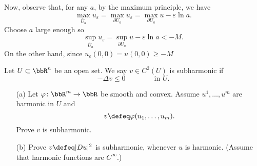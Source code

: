 \begin{solution}
  Now, observe that, for any \(a\), by the maximum principle, we have
  \[
    \max_{\bar U_a}u_\varepsilon=\max_{\partial
      U_a}u_\varepsilon=\max_{\partial U_a} u-\varepsilon \ln a.
  \]
  Choose \(a\) large enough so
  \[
    \sup_{\bar U_a} u_\varepsilon%
    =\sup_{\partial U_a} u-\varepsilon\ln a%
    <-M.
  \]
  On the other hand, since \(u_\varepsilon(0,0)=u(0,0)\geq -M\)
\end{solution}
\newpage

\begin{problem}
  Let \(U\subset\bbR^n\) be an open set. We say \(v \in C^2(U)\) is
  subharmonic if
  \[
    -\Delta v\leq 0\qquad\qquad\text{in \(U\).}
  \]
  \begin{itemize}
  \item[(a)] Let \(\varphi\colon\bbR^m\to\bbR\) be smooth and
    convex. Assume \(u^1,\dotsc,u^m\) are harmonic in \(U\) and
    \[
      v\defeq\varphi(u_1,\dotsc,u_m).
    \]
    Prove \(v\) is subharmonic.

    \noindent
    [\emph{Hint:} Convexity for a smooth function \(\varphi(z)\) is
    equivalent to \(\sum_{j,k=1}^m\varphi_{z_j,z_k}(z)\xi_j\xi_k\geq 0\)
    for any \(\xi\in\bbR^m\).]
  \item[(b)] Prove \(v\defeq|Du|^2\) is subharmonic, whenever \(u\) is
    harmonic. (Assume that harmonic functions are \(C^\infty\).)
  \end{itemize}
\end{problem}
